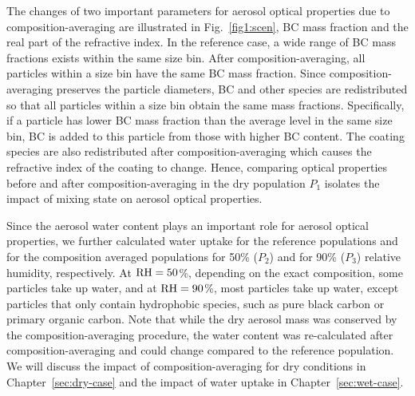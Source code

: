 \documentclass[edeposit,fullpage]{uiucthesis2009}
\newcommand{\jcedits}[1]{{\color{blue} #1}}
\begin{document}
The changes of two important parameters for aerosol optical properties
due to composition-averaging are illustrated in Fig.~\ref{fig1:scen},
BC mass fraction and the real part of the refractive index. In the
reference case, a wide range of BC mass fractions exists within the
same size bin. After composition-averaging, all particles within a
size bin have the same BC mass fraction.  Since composition-averaging
preserves the particle diameters, BC and other species are
redistributed so that all particles within a size bin obtain the same
mass fractions. Specifically, if a particle has lower BC mass fraction
than the average level in the same size bin, BC is added to this
particle from those with higher BC content. The coating species are
also redistributed after composition-averaging which causes the
refractive index of the coating to change. Hence, comparing optical
properties before and after composition-averaging in the dry
population $P_1$ isolates the impact of mixing state on aerosol
optical properties.


Since the aerosol water content plays an important role for aerosol
optical properties, we further calculated water uptake for the
reference populations and for the composition averaged populations for
50\% ($P_2$) and for 90\% ($P_3$) relative humidity, respectively.  At
$\rm RH = 50$\%, depending on the exact composition, some particles
take up water, and at $\rm RH = 90$\%, most particles take up water,
except particles that only contain hydrophobic species, \jcedits{such as} pure
black carbon or primary organic carbon. Note that while the dry
aerosol mass was conserved by the composition-averaging procedure, the
water content was re-calculated after composition-averaging and could
change compared to the reference population. We will discuss the
impact of composition-averaging for dry conditions in
Chapter~\ref{sec:dry-case} and the impact of water uptake in
Chapter~\ref{sec:wet-case}.
\end{document}
